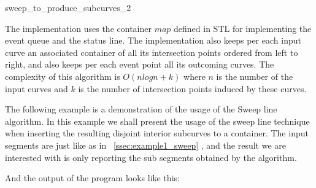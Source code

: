 \begin{ccRefFunction}[CGAL::]{sweep_to_produce_subcurves_2}
\ccImplementation 

The implementation uses the container $map$ defined in STL for
implementing the event queue and the status line.  The implementation
also keeps per each input curve an associated container of all its
intersection points ordered from left to right, and also keeps per
each event point all its outcoming curves.  The complexity of this
algorithm is $O(nlogn + k)$ where $n$ is the number of the input
curves and $k$ is the number of intersection points induced by these
curves.

\ccExample
\label{ssec:example3_sweep}
The following example is a demonstration of the usage of the \ccc
{Sweep line} algorithm. In this example we shall present the usage of
the sweep line technique when inserting the resulting disjoint
interior subcurves to a container. The input segments are just like as
in ~\ref{ssec:example1_sweep} , and the result we are interested with
is only reporting the sub segments obtained by the 
algorithm.


And the output of the program looks like this:


\end{ccRefFunction}


